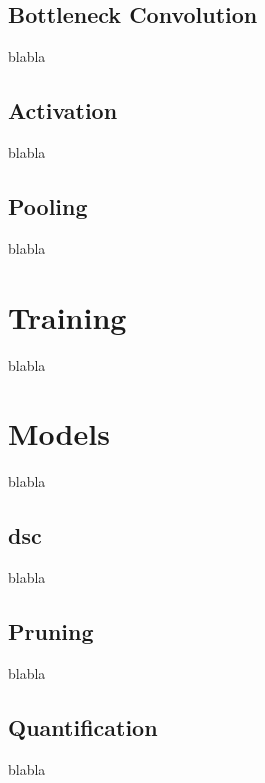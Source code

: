 \subsection{Bottleneck Convolution}
blabla
\subsection{Activation} \label{subs:acti}
blabla
\subsection{Pooling}
blabla
\section{Training}
blabla
\section{Models}
blabla
\subsection{\acrlong{dsc}}  \label{subs:mbv2}
blabla
\subsection{Pruning}
blabla
\subsection{Quantification}
blabla
